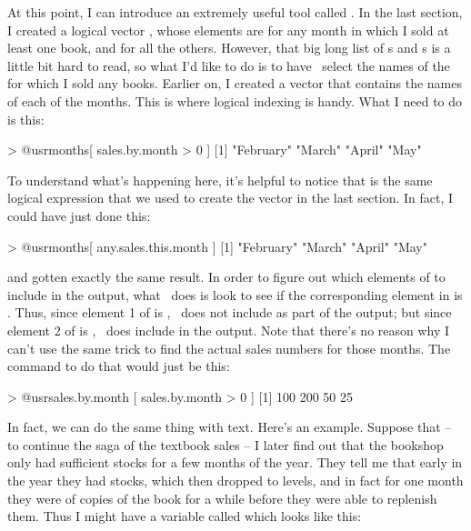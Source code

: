 At this point, I can introduce an extremely useful tool called . In the last section, I created a logical vector , whose elements are  for any month in which I sold at least one book, and  for all the others. However, that big long list of s and s is a little bit hard to read, so what I'd like to do is to have \R\ select the names of the  for which I sold any books. Earlier on, I created a vector  that contains the names of each of the months. This is where logical indexing is handy. What I need to do is this:
\begin{rblock1}
> @usr{months[ sales.by.month > 0 ]}
[1] "February" "March"    "April"    "May" 
\end{rblock1}
To understand what's happening here, it's helpful to notice that  is the same logical expression that we used to create the  vector in the last section. In fact, I could have just done this:
\begin{rblock1}
> @usr{months[ any.sales.this.month ]}
[1] "February" "March"    "April"    "May" 
\end{rblock1}
and gotten exactly the same result. In order to figure out which elements of  to include in the output, what \R\ does is look to see if the corresponding element in  is . Thus, since element 1 of  is , \R\ does not include  as part of the output; but since element 2 of  is , \R\ does include  in the output. Note that there's no reason why I can't use the same trick to find the actual sales numbers for those months. The command to do that would just be this:
\begin{rblock1}
> @usr{sales.by.month [ sales.by.month > 0 ]}
[1] 100 200  50  25
\end{rblock1}
In fact, we can do the same thing with text. Here's an example. Suppose that -- to continue the saga of the textbook sales -- I later find out that the bookshop only had sufficient stocks for a few months of the year. They tell me that early in the year they had  stocks, which then dropped to  levels, and in fact for one month they were  of copies of the book for a while before they were able to replenish them. Thus I might have a variable called  which looks like this:
